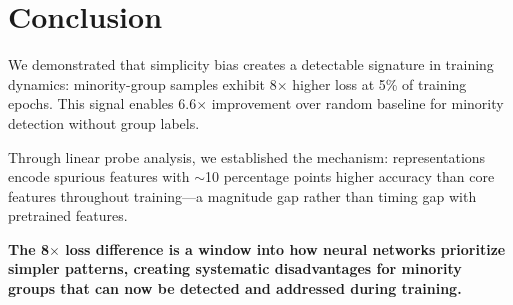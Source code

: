 \section{Conclusion}

We demonstrated that simplicity bias creates a detectable signature in training dynamics: minority-group samples exhibit 8$\times$ higher loss at 5\% of training epochs. This signal enables 6.6$\times$ improvement over random baseline for minority detection without group labels.

Through linear probe analysis, we established the mechanism: representations encode spurious features with $\sim$10 percentage points higher accuracy than core features throughout training---a magnitude gap rather than timing gap with pretrained features.

\textbf{The 8$\times$ loss difference is a window into how neural networks prioritize simpler patterns, creating systematic disadvantages for minority groups that can now be detected and addressed during training.}
